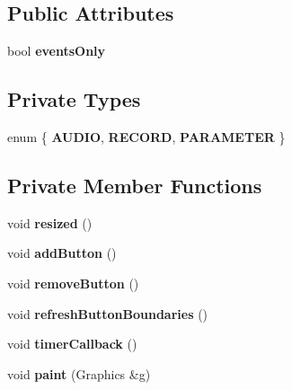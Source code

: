 \subsection*{Public Attributes}
\begin{DoxyCompactItemize}
\item 
\hypertarget{classChannelSelector_aa3a3c5a34e0c20248c1283acc0e91e3d}{bool {\bfseries events\-Only}}\label{classChannelSelector_aa3a3c5a34e0c20248c1283acc0e91e3d}

\end{DoxyCompactItemize}
\subsection*{Private Types}
\begin{DoxyCompactItemize}
\item 
enum \{ {\bfseries A\-U\-D\-I\-O}, 
{\bfseries R\-E\-C\-O\-R\-D}, 
{\bfseries P\-A\-R\-A\-M\-E\-T\-E\-R}
 \}
\end{DoxyCompactItemize}
\subsection*{Private Member Functions}
\begin{DoxyCompactItemize}
\item 
\hypertarget{classChannelSelector_acdc19312c258596a5786983526f8d5da}{void {\bfseries resized} ()}\label{classChannelSelector_acdc19312c258596a5786983526f8d5da}

\item 
\hypertarget{classChannelSelector_a05c5201380ab52ab9b310fcbb4ed11df}{void {\bfseries add\-Button} ()}\label{classChannelSelector_a05c5201380ab52ab9b310fcbb4ed11df}

\item 
\hypertarget{classChannelSelector_a999257dab86b930e09e64227e65b1c6a}{void {\bfseries remove\-Button} ()}\label{classChannelSelector_a999257dab86b930e09e64227e65b1c6a}

\item 
\hypertarget{classChannelSelector_a0b1994f1bc6978c452be67441f988144}{void {\bfseries refresh\-Button\-Boundaries} ()}\label{classChannelSelector_a0b1994f1bc6978c452be67441f988144}

\item 
\hypertarget{classChannelSelector_a0d7c58692724a9a47afbd2eea26f6453}{void {\bfseries timer\-Callback} ()}\label{classChannelSelector_a0d7c58692724a9a47afbd2eea26f6453}

\item 
\hypertarget{classChannelSelector_aa9a1eb97aa4f3760fb3777b50f7aac83}{void {\bfseries paint} (Graphics \&g)}\label{classChannelSelector_aa9a1eb97aa4f3760fb3777b50f7aac83}

\end{DoxyCompactItemize}
